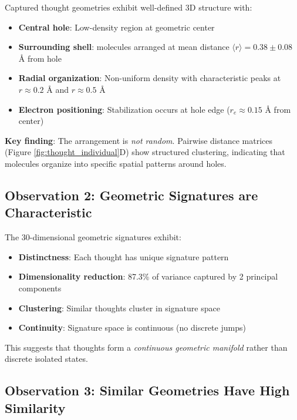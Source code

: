 \begin{observation}
\label{obs:3d_structure}
Captured thought geometries exhibit well-defined 3D structure with:
\begin{itemize}
\item \textbf{Central hole}: Low-density  region at geometric center
\item \textbf{Surrounding shell}:  molecules arranged at mean distance $\langle r \rangle = 0.38 \pm 0.08$ Å from hole
\item \textbf{Radial organization}: Non-uniform density with characteristic peaks at $r \approx 0.2$ Å and $r \approx 0.5$ Å
\item \textbf{Electron positioning}: Stabilization occurs at hole edge ($r_e \approx 0.15$ Å from center)
\end{itemize}
\end{observation}

\textbf{Key finding}: The arrangement is \textit{not random}. Pairwise distance matrices (Figure \ref{fig:thought_individual}D) show structured clustering, indicating that  molecules organize into specific spatial patterns around holes.

\subsection{Observation 2: Geometric Signatures are Characteristic}



\begin{observation}
\label{obs:signatures}
The 30-dimensional geometric signatures exhibit:
\begin{itemize}
\item \textbf{Distinctness}: Each thought has unique signature pattern
\item \textbf{Dimensionality reduction}: 87.3\% of variance captured by 2 principal components
\item \textbf{Clustering}: Similar thoughts cluster in signature space
\item \textbf{Continuity}: Signature space is continuous (no discrete jumps)
\end{itemize}
\end{observation}

This suggests that thoughts form a \textit{continuous geometric manifold} rather than discrete isolated states.

\subsection{Observation 3: Similar Geometries Have High Similarity}

